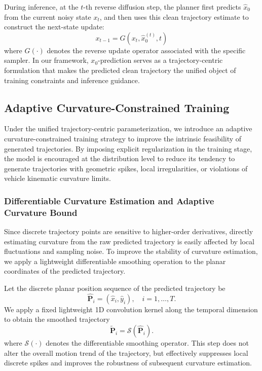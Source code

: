 \documentclass[3p,times,authoryear]{elsarticle}
\begin{document}
During inference, at the $t$-th reverse diffusion step, the planner first predicts $\hat{x}_0$ from the current noisy state $x_t$, and then uses this clean trajectory estimate to construct the next-state update:
\begin{equation}
x_{t-1} = G\!\left(x_t, \hat{x}_0^{(t)}, t\right)
\end{equation}
where $G(\cdot)$ denotes the reverse update operator associated with the specific sampler. In our framework, $x_0$-prediction serves as a trajectory-centric formulation that makes the predicted clean trajectory the unified object of training constraints and inference guidance.

\subsection{Adaptive Curvature-Constrained Training}

Under the unified trajectory-centric parameterization, we introduce an adaptive curvature-constrained training strategy to improve the intrinsic feasibility of generated trajectories. By imposing explicit regularization in the training stage, the model is encouraged at the distribution level to reduce its tendency to generate trajectories with geometric spikes, local irregularities, or violations of vehicle kinematic curvature limits.

\subsubsection{Differentiable Curvature Estimation and Adaptive Curvature Bound}

Since discrete trajectory points are sensitive to higher-order derivatives, directly estimating curvature from the raw predicted trajectory is easily affected by local fluctuations and sampling noise. To improve the stability of curvature estimation, we apply a lightweight differentiable smoothing operation to the planar coordinates of the predicted trajectory.

Let the discrete planar position sequence of the predicted trajectory be 
\begin{equation}
\hat{\mathbf{P}}_i = (\hat{x}_i,\hat{y}_i), \quad i = 1,\ldots,T.
\end{equation}
We apply a fixed lightweight 1D convolution kernel along the temporal dimension to obtain the smoothed trajectory
\begin{equation}
\tilde{\mathbf{P}}_i = \mathcal{S}\!\left(\hat{\mathbf{P}}_i\right).
\end{equation}
where $\mathcal{S}(\cdot)$ denotes the differentiable smoothing operator. This step does not alter the overall motion trend of the trajectory, but effectively suppresses local discrete spikes and improves the robustness of subsequent curvature estimation.
\end{document}

